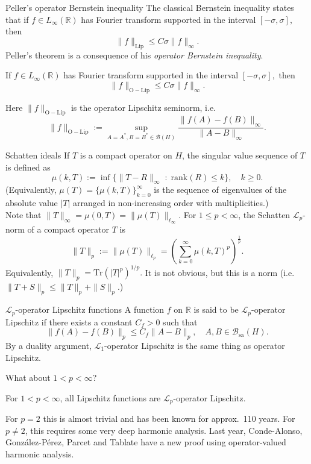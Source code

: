 \documentclass{beamer}
\numberwithin{equation}{section}
\theoremstyle{plain}
\theoremstyle{plain}
\theoremstyle{definition}
\theoremstyle{plain}
\theoremstyle{plain}
\theoremstyle{definition}
\newcommand{\Rl}{\mathbb{R}}
\newcommand{\Bc}{\mathcal{B}}
\newcommand{\Lc}{\mathcal{L}}
\newcommand{\Tr}{\mathrm{Tr}}
\newcommand{\sa}{\mathrm{sa}}
\begin{document}
\begin{frame}{Peller's operator Bernstein inequality}
    The classical Bernstein inequality states that if $f \in L_{\infty}(\Rl)$ has Fourier transform supported in the interval $[-\sigma,\sigma],$ then
    \[
        \|f\|_{\mathrm{Lip}} \leq C\sigma \|f\|_{\infty}.
    \]\pause
    Peller's theorem is a consequence of his \emph{operator Bernstein inequality}.
    \begin{theorem}[Peller (1990)]
        If $f \in L_{\infty}(\Rl)$ has Fourier transform supported in the interval $[-\sigma,\sigma],$ then
        \[
            \|f\|_{\mathrm{O-Lip}} \leq C\sigma\|f\|_\infty.
        \]
    \end{theorem}
    Here $\|f\|_{\mathrm{O-Lip}}$ is the operator Lipschitz seminorm, i.e.
    \[
        \|f\|_{\mathrm{O-Lip}} := \sup_{A=A^*,B=B^*\in \Bc(H)} \frac{\|f(A)-f(B)\|_{\infty}}{\|A-B\|_{\infty}}.
    \]
\end{frame}

\begin{frame}{Schatten ideals}
    If $T$ is a compact operator on $H$, the singular value sequence of $T$ is defined as
    $$
        \mu(k,T) := \inf\{\|T-R\|_{\infty}\;:\;\mathrm{rank}(R)\leq k\},\quad k\geq 0.
    $$
    (Equivalently, $\mu(T) = \{\mu(k,T)\}_{k=0}^\infty$ is the sequence of eigenvalues of the absolute value $|T|$ arranged in non-increasing order with multiplicities.)\\
    \pause
    Note that $\|T\|_\infty = \mu(0,T) = \|\mu(T)\|_{\ell_\infty}.$
    \pause
    For $1\leq p < \infty$, the Schatten $\Lc_p$-norm of a compact operator $T$ is
    $$
        \|T\|_p := \|\mu(T)\|_{\ell_p} = \left(\sum_{k=0}^\infty \mu(k,T)^p\right)^{\frac1p}.
    $$
    Equivalently, $\|T\|_p = \Tr(|T|^p)^{1/p}.$
    It is not obvious, but this is a norm (i.e. $\|T+S\|_p\leq \|T\|_p+\|S\|_p.$)
\end{frame}

\begin{frame}{$\Lc_p$-operator Lipschitz functions}
    A function $f$ on $\Rl$ is said to be $\Lc_p$-operator Lipschitz if there exists a constant $C_f>0$ such that
    $$
        \|f(A)-f(B)\|_p \leq C_f\|A-B\|_p,\quad A,B \in \Bc_{\sa}(H).
    $$
    By a duality argument, $\Lc_1$-operator Lipschitz is the same thing as operator Lipschitz.\pause
    
    What about $1 < p < \infty$?\pause
    \begin{theorem}
        For $1 < p < \infty$, all Lipschitz functions are $\Lc_p$-operator Lipschitz.
    \end{theorem}   
    \pause
    For $p=2$ this is almost trivial and has been known for approx.~110 years. For $p\neq 2$, this requires some very deep
    harmonic analysis. \pause
    Last year, Conde-Alonso, Gonz\'alez-P\'erez, Parcet and Tablate have a new proof using operator-valued harmonic analysis.
\end{frame}
\end{document}
